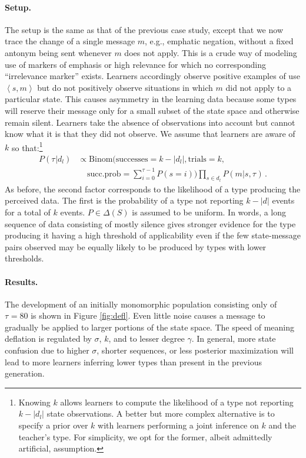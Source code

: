\documentclass[10pt,a4paper]{article}
\newcommand{\tuple}[1]{\ensuremath{\left\langle #1 \right\rangle}}
\newcommand{\type}[1]{\ensuremath{\tau_{#1}}}
\newcommand{\postparameter}{\ensuremath{\gamma}}
\begin{document}
\paragraph{Setup.} The setup is the same as that of the previous case study, except that
we now trace the change of a single message $m$, e.g., emphatic negation, without a fixed
antonym being sent whenever $m$ does not apply. This is a crude way of modeling use of
markers of emphasis or high relevance for which no corresponding ``irrelevance marker''
exists. Learners accordingly observe positive examples of use $\tuple{s,m}$ but do not
positively observe situations in which $m$ did not apply to a particular state. This causes
asymmetry in the learning data because some types will reserve their message only for a
small subset of the state space and otherwise remain silent. Learners take the absence of
observations into account but cannot know what it is that they did not observe. We assume that
learners are aware of $k$ so that:\footnote{Knowing $k$ allows learners to compute the
  likelihood of a type not reporting $k -|d_l|$ state observations. A better but more complex
  alternative is to specify a prior over $k$ with learners performing a joint inference on $k$
  and the teacher's type. For simplicity, we opt for the former, albeit admittedly artificial,
  assumption.}
\begin{align*}
  P(\type{} | d_l) & \propto \text{Binom}(\text{successes} =
  k-|d_l|, \text{trials} = k, \\
  & 
  \ \ \ \ \ \text{succ.prob} = \sum_{i=0}^{\type{}-1} P(s = i)) \prod_{s \in d_l} P(m|s,\type{})\,.
\end{align*}
As before, the second factor corresponds to the
likelihood of a type producing the perceived data.  The first is the probability of a type not
reporting $k-|d|$ events for a total of $k$ events. $P \in \Delta(S)$ is assumed to be
uniform. In words, a long sequence of data consisting of mostly silence gives stronger evidence
for the type producing it having a high threshold of applicability even if the few state-message pairs observed may be equally likely to be produced by types with lower thresholds.

\paragraph{Results.} The development of an initially monomorphic population consisting only of
$\type{} = 80$ is shown in Figure \ref{fig:defl}. Even little noise causes a message to gradually be
applied to larger portions of the state space. The speed of meaning deflation is regulated by
$\sigma$, $k$, and to lesser degree $\postparameter$. In general, more state confusion due to higher
$\sigma$, shorter sequences, or less posterior maximization will lead to more learners
inferring lower types than present in the previous generation.
\end{document}
